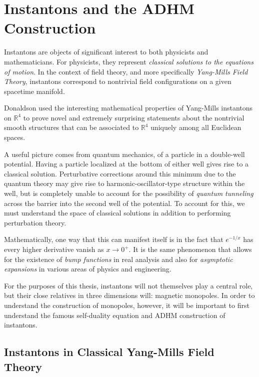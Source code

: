 \chapter{Instantons and the ADHM Construction\label{ch:instantons}}

Instantons are objects of significant interest to both physicists and mathematicians. 
For physicists, they represent \emph{classical solutions to the equations of motion}. In the context of field theory, and more specifically \emph{Yang-Mills Field Theory}, instantons correspond to nontrivial field configurations on a given spacetime manifold. 

Donaldson used the interesting mathematical properties of Yang-Mills instantons on $\mathbb R^4$ to prove novel and extremely surprising statements about the nontrivial smooth structures that can be associated to $\mathbb R^4$ uniquely among all Euclidean spaces\cite{donaldson1984}. 

A useful picture comes from quantum mechanics, of a particle in a double-well potential. Having a particle localized at the bottom of either well gives rise to a classical solution. Perturbative corrections around this minimum due to the quantum theory may give rise to harmonic-oscillator-type structure within the well, but is completely unable to account for the possibility of \emph{quantum tunneling} across the barrier into the second well of the potential. To account for this, we must understand the space of classical solutions in addition to performing perturbation theory. 

Mathematically, one way that this can manifest itself is in the fact that $e^{-1/x}$ has every higher derivative vanish as $x \to 0^+$. It is the same phenomenon that allows for the existence of \emph{bump functions} in real analysis and also for \emph{asymptotic expansions} in various areas of physics and engineering.

For the purposes of this thesis, instantons will not themselves play a central role, but their close relatives in three dimensions will: magnetic monopoles. In order to understand the construction of monopoles, however, it will be important to first understand the famous self-duality equation and ADHM construction of instantons. 


\section{Instantons in Classical Yang-Mills Field Theory} %
\label{sec:instantons_in_classical_yang_mills_field_theory}

